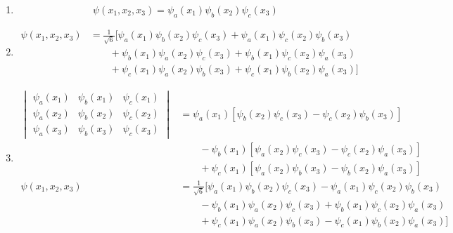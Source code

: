\documentclass{article}
\begin{document}
\begin{enumerate}
  \item \[\psi(x_1, x_2, x_3) = \psi_a(x_1) \psi_b(x_2) \psi_c(x_3)\]

  \item

        \begin{align*}
          \psi(x_1, x_2, x_3) & = \frac{1}{\sqrt{6}} [\psi_a(x_1) \psi_b(x_2) \psi_c(x_3) + \psi_a(x_1) \psi_c(x_2) \psi_b(x_3) \\
                              & \qquad + \psi_b(x_1) \psi_a(x_2) \psi_c(x_3) + \psi_b(x_1) \psi_c(x_2) \psi_a(x_3)              \\
                              & \qquad + \psi_c(x_1) \psi_a(x_2) \psi_b(x_3) + \psi_c(x_1) \psi_b(x_2) \psi_a(x_3)]
        \end{align*}

  \item

        \begin{align*}
          \begin{vmatrix}
            \psi_a(x_1) & \psi_b(x_1) & \psi_c(x_1) \\
            \psi_a(x_2) & \psi_b(x_2) & \psi_c(x_2) \\
            \psi_a(x_3) & \psi_b(x_3) & \psi_c(x_3)
          \end{vmatrix} & = \psi_a(x_1) [\psi_b(x_2) \psi_c(x_3) - \psi_c(x_2) \psi_b(x_3)]                                                            \\
                                                     & \qquad - \psi_b(x_1) [\psi_a(x_2) \psi_c(x_3) - \psi_c(x_2) \psi_a(x_3)]                        \\
                                                     & \qquad + \psi_c(x_1) [\psi_a(x_2) \psi_b(x_3) - \psi_b(x_2) \psi_a(x_3)]                        \\
          \psi(x_1, x_2, x_3)                        & = \frac{1}{\sqrt{6}} [\psi_a(x_1) \psi_b(x_2) \psi_c(x_3) - \psi_a(x_1) \psi_c(x_2) \psi_b(x_3) \\
                                                     & \qquad - \psi_b(x_1) \psi_a(x_2) \psi_c(x_3) + \psi_b(x_1) \psi_c(x_2) \psi_a(x_3)              \\
                                                     & \qquad + \psi_c(x_1) \psi_a(x_2) \psi_b(x_3) - \psi_c(x_1) \psi_b(x_2) \psi_a(x_3)]
        \end{align*}
\end{enumerate}
\end{document}
